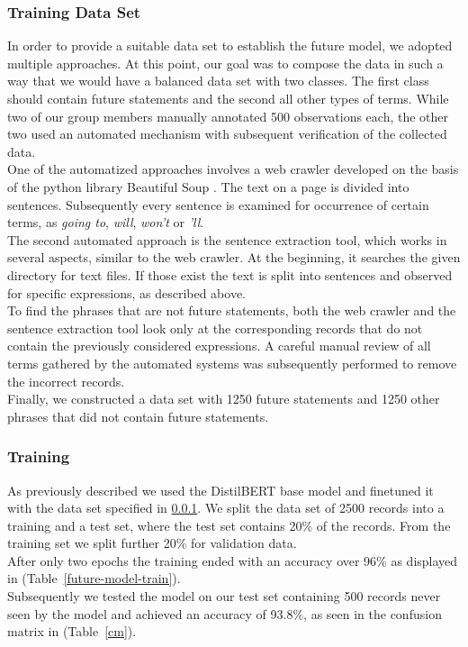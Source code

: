 \subsubsection{Training Data Set}
\label{training}
In order to provide a suitable data set to establish the future model, we adopted multiple approaches.
At this point, our goal was to compose the data in such a way that we would have a balanced data set with two classes.
The first class should contain future statements and the second all other types of terms.
While two of our group members manually annotated 500 observations each, the other two used an automated mechanism with subsequent verification of the collected data.
\\
One of the automatized approaches involves a web crawler developed on the basis of the python library Beautiful Soup \citep{Richardson2022}.
The text on a page is divided into sentences.
Subsequently every sentence is examined for occurrence of certain terms, as \emph{going to}, \emph{will}, \emph{won't} or \emph{'ll}.
\\
The second automated approach is the sentence extraction tool, which works in several aspects, similar to the web crawler.
At the beginning, it searches the given directory for text files.
If those exist the text is split into sentences and observed for specific expressions, as described above.
\\
To find the phrases that are not future statements, both the web crawler and the sentence extraction tool look only at the corresponding records that do not contain the previously considered expressions.
A careful manual review of all terms gathered by the automated systems was subsequently performed to remove the incorrect records.
\\
Finally, we constructed a data set with 1250 future statements and 1250 other phrases that did not contain future statements.

\subsubsection{Training}
As previously described we used the DistilBERT base model and finetuned it with the data set specified in \ref{training}.
We split the data set of 2500 records into a training and a test set, where the test set contains 20\% of the records.
From the training set we split further 20\% for validation data.
\\
After only two epochs the training ended with an accuracy over 96\% as displayed in (Table~\ref{future-model-train}).
\\
Subsequently we tested the model on our test set containing 500 records never seen by the model and achieved an accuracy of 93.8\%, as seen in the confusion matrix in (Table~\ref{cm}).

